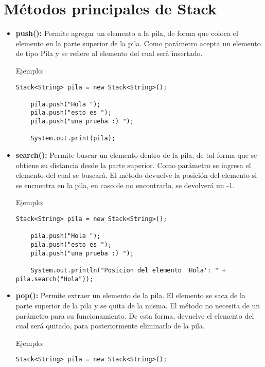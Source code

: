 \documentclass[12pt, letterpaper]{article} %
\begin{document}
\section*{Métodos principales de Stack}
\begin{itemize}
    \item \textbf{push():} Permite agregar un elemento a la pila, de forma que coloca el elemento en la parte superior de la pila. Como parámetro acepta un elemento de tipo Pila y se refiere al elemento del cual será insertado. 

    Ejemplo:
    \lstset{language = Java, breaklines=true, basicstyle=\footnotesize}
    \begin{lstlisting}[frame=single]
    Stack<String> pila = new Stack<String>();

    pila.push("Hola ");
    pila.push("esto es ");
    pila.push("una prueba :) ");

    System.out.print(pila);
    \end{lstlisting}

    \item \textbf{search():} Permite buscar un elemento dentro de la pila, de tal forma que se obtiene su distancia desde la parte superior. Como parámetro se ingresa el elemento del cual se buscará. El método devuelve la posición del elemento si se encuentra en la pila, en caso de no encontrarlo, se devolverá un -1.

    Ejemplo:
    \lstset{language = Java, breaklines=true, basicstyle=\footnotesize}
    \begin{lstlisting}[frame=single]
    Stack<String> pila = new Stack<String>();

    pila.push("Hola ");
    pila.push("esto es ");
    pila.push("una prueba :) ");

    System.out.println("Posicion del elemento 'Hola': " + pila.search("Hola"));
    \end{lstlisting}

    \item \textbf{pop():} Permite extraer un elemento de la pila. El elemento se saca de la parte superior de la pila y se quita de la misma. El método no necesita de un parámetro para su funcionamiento. De esta forma, devuelve el elemento del cual será quitado, para posteriormente eliminarlo de la pila. 
    
    Ejemplo:
    \lstset{language = Java, breaklines=true, basicstyle=\footnotesize}
    \begin{lstlisting}[frame=single]
    Stack<String> pila = new Stack<String>();


\end{lstlisting}
\end{itemize}
\end{document}

